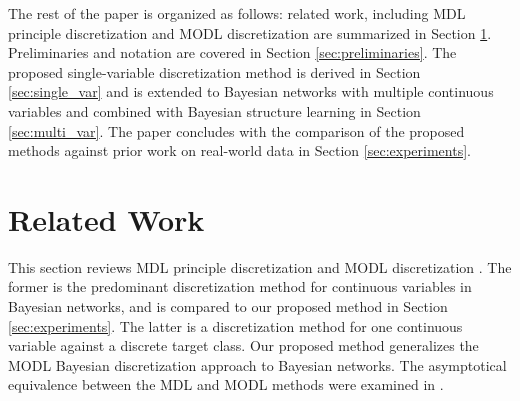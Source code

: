 
The rest of the paper is organized as follows: related work, including MDL principle discretization \citep{Friedman_1996} and MODL discretization \citet{Boulle_2006} are summarized in Section \ref{sec:related_work}. Preliminaries and notation are covered in Section \ref{sec:preliminaries}. The proposed single-variable discretization method is derived in Section \ref{sec:single_var} and is extended to Bayesian networks with multiple continuous variables and combined with Bayesian structure learning in Section \ref{sec:multi_var}. The paper concludes with the comparison of the proposed methods against prior work on real-world data in Section \ref{sec:experiments}.


\section{Related Work}
\label{sec:related_work}
This section reviews MDL principle discretization \citep{Friedman_1996} and MODL discretization \citep{Boulle_2006}. The former is the predominant discretization method for continuous variables in Bayesian networks, and is compared to our proposed method in Section \ref{sec:experiments}. The latter is a discretization method for one continuous variable against a discrete target class. Our proposed method generalizes the MODL Bayesian discretization approach to Bayesian networks. The asymptotical equivalence between the MDL and MODL methods were examined in \citep{VL_2000}.

